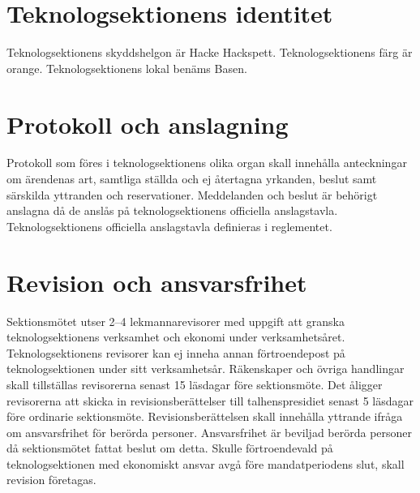 \documentclass[a4paper]{dtek}
\begin{document}
\section{Teknologsektionens identitet}
\para[Skyddshelgon] Teknologsektionens skyddshelgon är Hacke Hackspett.
\para[Sektionsfärg] Teknologsektionens färg är orange.
\para[Sektionslokal] Teknologsektionens lokal benäms Basen.

\section{Protokoll och anslagning}
\para[Allmänt] Protokoll som föres i teknologsektionens olika organ skall innehålla anteckningar om ärendenas art, samtliga ställda och ej återtagna yrkanden, beslut samt särskilda yttranden och reservationer.
\para[Anslagning] Meddelanden och beslut är behörigt anslagna då de anslås på teknologsektionens officiella anslagstavla. Teknologsektionens officiella anslagstavla definieras i reglementet.

\section{Revision och ansvarsfrihet}
\para[Revisorer] Sektionsmötet utser 2–4 lekmannarevisorer med uppgift att granska teknologsektionens verksamhet och ekonomi under verksamhetsåret.
\stycke Teknologsektionens revisorer kan ej inneha annan förtroendepost på teknologsektionen under sitt verksamhetsår.
\stycke Räkenskaper och övriga handlingar skall tillställas revisorerna senast 15 läsdagar före sektionsmöte.
\para[Åligganden] Det åligger revisorerna att skicka in revisionsberättelser till talhenspresidiet senast 5 läsdagar före ordinarie sektionsmöte.
\stycke Revisionsberättelsen skall innehålla yttrande ifråga om ansvarsfrihet för berörda personer.
\para[Ansvarsfrihet] Ansvarsfrihet är beviljad berörda personer då sektionsmötet fattat beslut om detta.
\stycke Skulle förtroendevald på teknologsektionen med ekonomiskt ansvar avgå före mandatperiodens slut, skall revision företagas.

\end{document}
